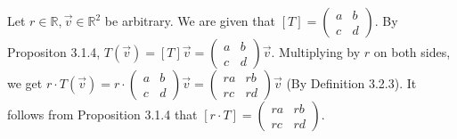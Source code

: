 \documentclass[12pt]{article}
\newenvironment{problem}[2][Problem]
{
	\begin{trivlist} 
		\item[\hskip \labelsep {\bfseries #1 #2:}]
	}
{
	\end{trivlist}
	}
\newenvironment{solution}[1][Solution]
{
	\begin{trivlist} 
		\item[\hskip \labelsep {\itshape #1:}]
	}
	{
	\end{trivlist}
}
\begin{document}
\begin{problem}{6}
\begin{solution}
Let $r \in \mathbb{R}, \vec{v} \in \mathbb{R}^2$ be arbitrary. We are given that $[T]=\begin{pmatrix} a&b\\c&d\end{pmatrix}$. By Propositon 3.1.4, $T(\vec{v}) = [T] \vec{v} = \begin{pmatrix} a&b\\c&d\end{pmatrix}\vec{v}$. Multiplying by $r$ on both sides, we get $r\cdot T(\vec{v}) = r \cdot \begin{pmatrix} a&b\\c&d\end{pmatrix} \vec{v} = \begin{pmatrix} ra&rb\\rc&rd\end{pmatrix} \vec{v}$ (By Definition 3.2.3). It follows from Proposition 3.1.4 that $[r\cdot T] = \begin{pmatrix} ra&rb\\rc&rd\end{pmatrix}$.
\end{solution}

\end{problem}
\end{document}

